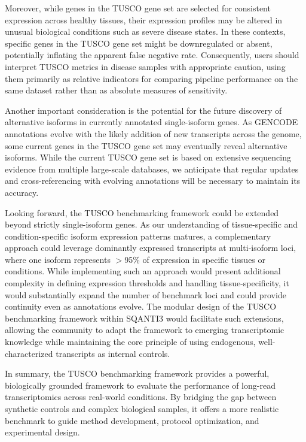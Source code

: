 \documentclass[pdflatex,sn-nature]{sn-jnl}%
\newcommand{\tuscoGeneSet}{TUSCO gene set}
\newcommand{\tuscoBenchmarkingFramework}{TUSCO benchmarking framework}
\newcommand{\tuscoMetrics}{TUSCO metrics}
\begin{document}
Moreover, while genes in the \tuscoGeneSet{} are selected for consistent expression across healthy tissues, their expression profiles may be altered in unusual biological conditions such as severe disease states. In these contexts, specific genes in the \tuscoGeneSet{} might be downregulated or absent, potentially inflating the apparent false negative rate. Consequently, users should interpret \tuscoMetrics{} in disease samples with appropriate caution, using them primarily as relative indicators for comparing pipeline performance on the same dataset rather than as absolute measures of sensitivity.

Another important consideration is the potential for the future discovery of alternative isoforms in currently annotated single-isoform genes. As GENCODE annotations evolve with the likely addition of new transcripts across the genome, some current genes in the \tuscoGeneSet{} may eventually reveal alternative isoforms. While the current \tuscoGeneSet{} is based on extensive sequencing evidence from multiple large-scale databases, we anticipate that regular updates and cross-referencing with evolving annotations will be necessary to maintain its accuracy.

Looking forward, the \tuscoBenchmarkingFramework{} could be extended beyond strictly single-isoform genes. As our understanding of tissue-specific and condition-specific isoform expression patterns matures, a complementary approach could leverage dominantly expressed transcripts at multi-isoform loci, where one isoform represents $>$95\% of expression in specific tissues or conditions. While implementing such an approach would present additional complexity in defining expression thresholds and handling tissue-specificity, it would substantially expand the number of benchmark loci and could provide continuity even as annotations evolve. The modular design of the \tuscoBenchmarkingFramework{} within SQANTI3 would facilitate such extensions, allowing the community to adapt the framework to emerging transcriptomic knowledge while maintaining the core principle of using endogenous, well-characterized transcripts as internal controls.

In summary, the \tuscoBenchmarkingFramework{} provides a powerful, biologically grounded framework to evaluate the performance of long-read transcriptomics across real-world conditions. By bridging the gap between synthetic controls and complex biological samples, it offers a more realistic benchmark to guide method development, protocol optimization, and experimental design.
\end{document}

